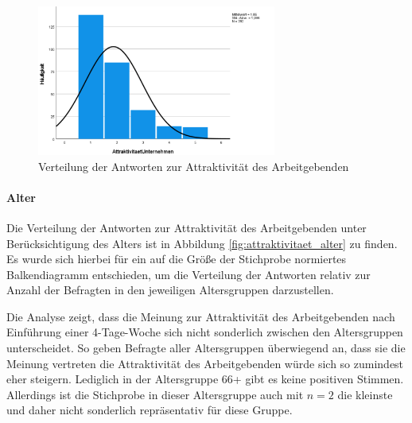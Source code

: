 \begin{figure}[h]
    \centering
    \includegraphics[width=0.7\textwidth]{04_Artefakte/01_Abbildungen/hypothese_5/attraktivitaet_histogram.png}
    \caption{Verteilung der Antworten zur Attraktivität des Arbeitgebenden}
    \label{fig:attraktivitaet_verteilung}
\end{figure}

\paragraph*{Alter}


Die Verteilung der Antworten zur Attraktivität des Arbeitgebenden unter Berücksichtigung des Alters ist in Abbildung \ref{fig:attraktivitaet_alter}
zu finden. Es wurde sich hierbei für ein auf die Größe der Stichprobe normiertes Balkendiagramm entschieden, um die Verteilung der Antworten
relativ zur Anzahl der Befragten in den jeweiligen Altersgruppen darzustellen.

Die Analyse zeigt, dass die Meinung zur Attraktivität des Arbeitgebenden nach Einführung einer 4-Tage-Woche sich nicht sonderlich zwischen den
Altersgruppen unterscheidet. So geben Befragte aller Altersgruppen überwiegend an, dass sie die Meinung vertreten die Attraktivität des Arbeitgebenden würde sich
so zumindest eher steigern. Lediglich in der Altersgruppe 66+ gibt es keine positiven Stimmen. Allerdings ist die Stichprobe in dieser Altersgruppe
auch mit $n=2$ die kleinste und daher nicht sonderlich repräsentativ für diese Gruppe.


